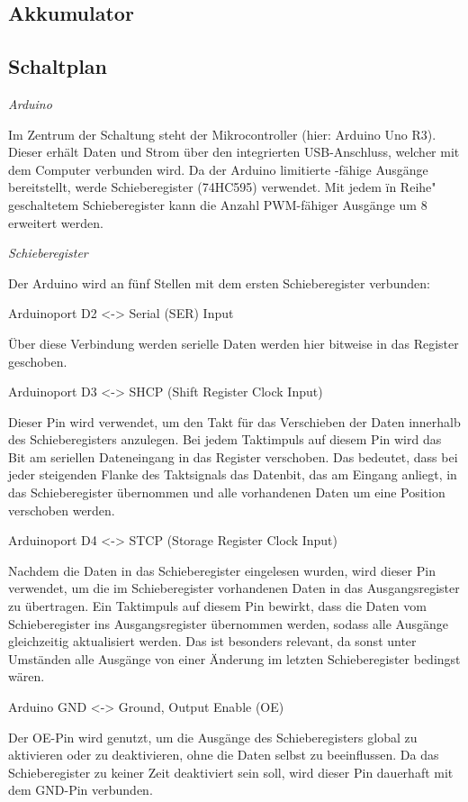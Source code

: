 \subsection{Akkumulator}
\subsection{Schaltplan}

\textit{Arduino}

Im Zentrum der Schaltung steht der Mikrocontroller (hier: Arduino Uno R3).
Dieser erhält Daten und Strom über den integrierten USB-Anschluss, welcher mit dem Computer verbunden wird.
Da der Arduino limitierte -fähige Ausgänge bereitstellt, werde Schieberegister (74HC595) verwendet.
Mit jedem \"in Reihe" geschaltetem Schieberegister kann die Anzahl PWM-fähiger Ausgänge um 8 erweitert werden.

\textit{Schieberegister}

Der Arduino wird an fünf Stellen mit dem ersten Schieberegister verbunden:

Arduinoport D2 <-> Serial (SER) Input

Über diese Verbindung werden serielle Daten werden hier bitweise in das Register geschoben.

Arduinoport D3 <-> SHCP (Shift Register Clock Input)

Dieser Pin wird verwendet, um den Takt für das Verschieben der Daten innerhalb des Schieberegisters anzulegen.
Bei jedem Taktimpuls auf diesem Pin wird das Bit am seriellen Dateneingang in das Register verschoben.
Das bedeutet, dass bei jeder steigenden Flanke des Taktsignals das Datenbit, das am Eingang anliegt, in das Schieberegister übernommen und alle vorhandenen Daten um eine Position verschoben werden.

Arduinoport D4 <-> STCP (Storage Register Clock Input)

Nachdem die Daten in das Schieberegister eingelesen wurden, wird dieser Pin verwendet, um die im Schieberegister vorhandenen Daten in das Ausgangsregister zu übertragen.
Ein Taktimpuls auf diesem Pin bewirkt, dass die Daten vom Schieberegister ins Ausgangsregister übernommen werden, sodass alle Ausgänge gleichzeitig aktualisiert werden.
Das ist besonders relevant, da sonst unter Umständen alle Ausgänge von einer Änderung im letzten Schieberegister bedingst wären.

Arduino GND <-> Ground, Output Enable (OE)

Der OE-Pin wird genutzt, um die Ausgänge des Schieberegisters global zu aktivieren oder zu deaktivieren, ohne die Daten selbst zu beeinflussen.
Da das Schieberegister zu keiner Zeit deaktiviert sein soll, wird dieser Pin dauerhaft mit dem GND-Pin verbunden.

